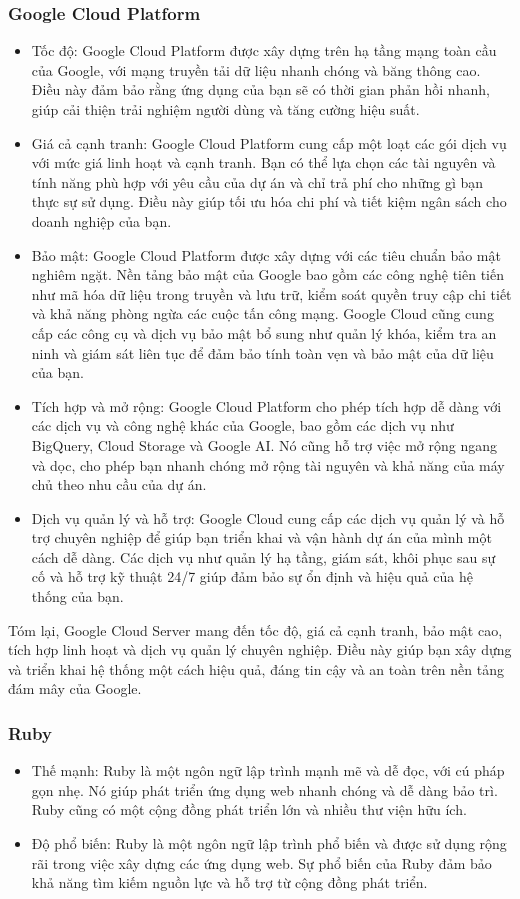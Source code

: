 \documentclass[../Thesis.tex]{subfiles}
\begin{document}
		\subsubsection{Google Cloud Platform}
			\begin{itemize}
				\item Tốc độ: Google Cloud Platform được xây dựng trên hạ tầng mạng toàn cầu của Google, với mạng truyền tải dữ liệu nhanh chóng và băng thông cao. Điều này đảm bảo rằng ứng dụng của bạn sẽ có thời gian phản hồi nhanh, giúp cải thiện trải nghiệm người dùng và tăng cường hiệu suất.
				\item Giá cả cạnh tranh: Google Cloud Platform cung cấp một loạt các gói dịch vụ với mức giá linh hoạt và cạnh tranh. Bạn có thể lựa chọn các tài nguyên và tính năng phù hợp với yêu cầu của dự án và chỉ trả phí cho những gì bạn thực sự sử dụng. Điều này giúp tối ưu hóa chi phí và tiết kiệm ngân sách cho doanh nghiệp của bạn.
				\item Bảo mật: Google Cloud Platform được xây dựng với các tiêu chuẩn bảo mật nghiêm ngặt. Nền tảng bảo mật của Google bao gồm các công nghệ tiên tiến như mã hóa dữ liệu trong truyền và lưu trữ, kiểm soát quyền truy cập chi tiết và khả năng phòng ngừa các cuộc tấn công mạng. Google Cloud cũng cung cấp các công cụ và dịch vụ bảo mật bổ sung như quản lý khóa, kiểm tra an ninh và giám sát liên tục để đảm bảo tính toàn vẹn và bảo mật của dữ liệu của bạn.
				\item Tích hợp và mở rộng: Google Cloud Platform cho phép tích hợp dễ dàng với các dịch vụ và công nghệ khác của Google, bao gồm các dịch vụ như BigQuery, Cloud Storage và Google AI. Nó cũng hỗ trợ việc mở rộng ngang và dọc, cho phép bạn nhanh chóng mở rộng tài nguyên và khả năng của máy chủ theo nhu cầu của dự án.
				\item Dịch vụ quản lý và hỗ trợ: Google Cloud cung cấp các dịch vụ quản lý và hỗ trợ chuyên nghiệp để giúp bạn triển khai và vận hành dự án của mình một cách dễ dàng. Các dịch vụ như quản lý hạ tầng, giám sát, khôi phục sau sự cố và hỗ trợ kỹ thuật 24/7 giúp đảm bảo sự ổn định và hiệu quả của hệ thống của bạn.
			\end{itemize}
			Tóm lại, Google Cloud Server mang đến tốc độ, giá cả cạnh tranh, bảo mật cao, tích hợp linh hoạt và dịch vụ quản lý chuyên nghiệp. Điều này giúp bạn xây dựng và triển khai hệ thống một cách hiệu quả, đáng tin cậy và an toàn trên nền tảng đám mây của Google.

		\subsubsection{Ruby}
			\begin{itemize}
				\item Thế mạnh: Ruby là một ngôn ngữ lập trình mạnh mẽ và dễ đọc, với cú pháp gọn nhẹ. Nó giúp phát triển ứng dụng web nhanh chóng và dễ dàng bảo trì. Ruby cũng có một cộng đồng phát triển lớn và nhiều thư viện hữu ích.
				\item Độ phổ biến: Ruby là một ngôn ngữ lập trình phổ biến và được sử dụng rộng rãi trong việc xây dựng các ứng dụng web. Sự phổ biến của Ruby đảm bảo khả năng tìm kiếm nguồn lực và hỗ trợ từ cộng đồng phát triển.
			\end{itemize}
\end{document}
